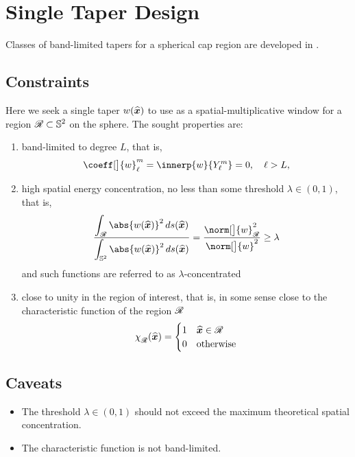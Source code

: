 \documentclass[10pt, twocolumn, twoside]{IEEEtran}
\newcommand{\untsph}{\mathbb{S}^{2}} %
\newcommand{\unit}[1]{\widehat{\bm{#1}}}
\begin{document}
\IEEEpeerreviewmaketitle



\section{Single Taper Design}


Classes of band-limited tapers for a spherical cap region are developed in \cite{Wieczorek:2005}.

\subsection{Constraints}

Here we seek a single taper $\taper(\unit{x})$ to use as a spatial-multiplicative window for a region $\R\subset\untsph$ on the sphere.  The sought properties are:
\begin{enumerate}
\item band-limited to degree $L$, that is,
\[
\coeff[\big]{\taper}_{\ell}^{m} = \innerp{\taper}{Y_{\ell}^{m}} = 0,\quad \ell>L,
\]
\item high spatial energy concentration, no less than some threshold $\lambda\in(0,1)$, that is,
\[
\frac{\displaystyle\int_{\R} \abs{\taper(\unit{x})}^2\,ds(\unit{x})}
{\displaystyle\int_{\untsph} \abs{\taper(\unit{x})}^2\,ds(\unit{x})} =
\frac{\norm[\big]{\taper}_{\R}^2}
{\norm[\big]{\taper}^2}
\geq \lambda
\]
and such functions are referred to as $\lambda$-concentrated

\item close to unity in the region of interest, that is, in some sense close to the characteristic function of the region $\mathscr{R}$
\[
\chfn(\unit{x}) =
\begin{cases}
1 & \unit{x}\in\R \\
0 & \text{otherwise}%
\end{cases}
\]
\end{enumerate}

\subsection{Caveats}

\begin{itemize}
\item
The threshold $\lambda\in(0,1)$ should not exceed the maximum theoretical spatial concentration. 

\item
The characteristic function is not band-limited.
\end{itemize}
\end{document}
